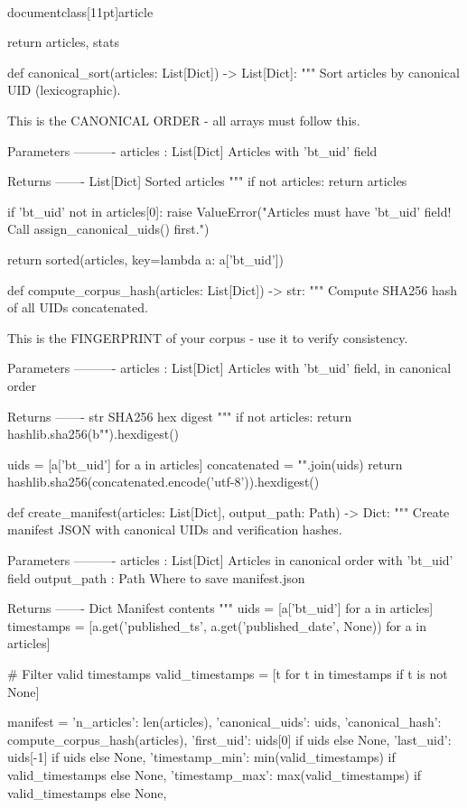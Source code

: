 \\documentclass[11pt]{article}
\begin{document}
\begin{CodeBlock}
    return articles, stats


def canonical_sort(articles: List[Dict]) -> List[Dict]:
    """
    Sort articles by canonical UID (lexicographic).
    
    This is the CANONICAL ORDER - all arrays must follow this.
    
    Parameters
    ----------
    articles : List[Dict]
        Articles with 'bt_uid' field
    
    Returns
    -------
    List[Dict]
        Sorted articles
    """
    if not articles:
        return articles
    
    if 'bt_uid' not in articles[0]:
        raise ValueError("Articles must have 'bt_uid' field! Call assign_canonical_uids() first.")
    
    return sorted(articles, key=lambda a: a['bt_uid'])


def compute_corpus_hash(articles: List[Dict]) -> str:
    """
    Compute SHA256 hash of all UIDs concatenated.
    
    This is the FINGERPRINT of your corpus - use it to verify consistency.
    
    Parameters
    ----------
    articles : List[Dict]
        Articles with 'bt_uid' field, in canonical order
    
    Returns
    -------
    str
        SHA256 hex digest
    """
    if not articles:
        return hashlib.sha256(b"").hexdigest()
    
    uids = [a['bt_uid'] for a in articles]
    concatenated = "".join(uids)
    return hashlib.sha256(concatenated.encode('utf-8')).hexdigest()


def create_manifest(articles: List[Dict], output_path: Path) -> Dict:
    """
    Create manifest JSON with canonical UIDs and verification hashes.
    
    Parameters
    ----------
    articles : List[Dict]
        Articles in canonical order with 'bt_uid' field
    output_path : Path
        Where to save manifest.json
    
    Returns
    -------
    Dict
        Manifest contents
    """
    uids = [a['bt_uid'] for a in articles]
    timestamps = [a.get('published_ts', a.get('published_date', None)) for a in articles]
    
    # Filter valid timestamps
    valid_timestamps = [t for t in timestamps if t is not None]
    
    manifest = {
        'n_articles': len(articles),
        'canonical_uids': uids,
        'canonical_hash': compute_corpus_hash(articles),
        'first_uid': uids[0] if uids else None,
        'last_uid': uids[-1] if uids else None,
        'timestamp_min': min(valid_timestamps) if valid_timestamps else None,
        'timestamp_max': max(valid_timestamps) if valid_timestamps else None,
    }
    

\end{CodeBlock}
\end{document}
